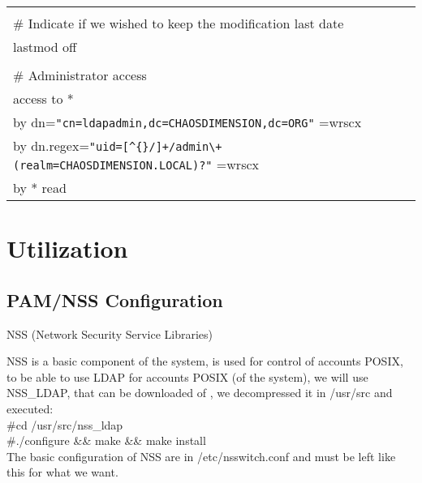 \begin{center}
\begin{longtable}{|ll|}
 & \\
\# Indicate if we wished to keep the modification last date & \\
lastmod off & \\
 & \\
\# Administrator access & \\
access to * & \\
        by dn=\verb|"cn=ldapadmin,dc=CHAOSDIMENSION,dc=ORG"| =wrscx & \\
        by dn.regex=\verb|"uid=[^{}/]+/admin\+(realm=CHAOSDIMENSION.LOCAL)?"| =wrscx & \\
        by * read & \\
\end{longtable}
\end{center}


\section{Utilization}
\subsection{PAM/NSS Configuration}

NSS (Network Security Service Libraries) 

NSS is a basic component of the system, is used for control of accounts POSIX, to be able to use LDAP for accounts POSIX (of the system), we will use NSS\_LDAP, that can be downloaded of  , we decompressed it in /usr/src and executed:\\ 

\noindent \#cd /usr/src/nss\_ldap\\
\noindent \#./configure \&\& make \&\& make install\\

The basic configuration of NSS are in /etc/nsswitch.conf and must be left like this for what we want.

